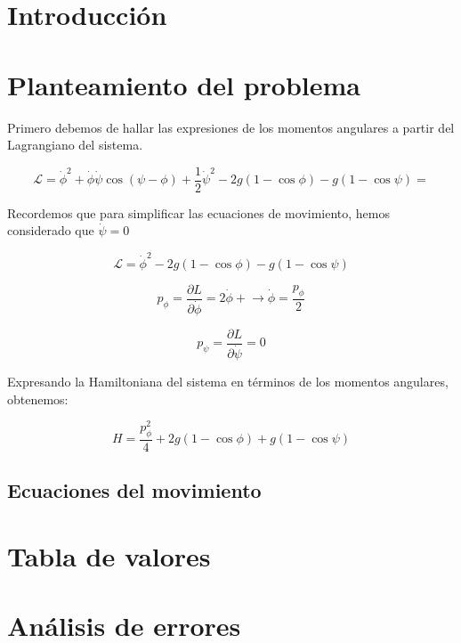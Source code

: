 \documentclass[11pt, twoside]{article} %
\begin{document}
\pagestyle{main}

\section{Introducción}

\section{Planteamiento del problema}
Primero debemos de hallar las expresiones de los momentos angulares
a partir del Lagrangiano del sistema. 

\begin{equation}
    \mathcal{L} = \dot{\phi}^2 + \dot{\phi}\dot{\psi} \cos(\psi - \phi) +
     \frac{1}{2}\dot{\psi}^2 - 2g(1-\cos\phi) - g(1-\cos\psi) = 
\end{equation}

Recordemos que para simplificar las ecuaciones de movimiento, 
hemos considerado que $\dot{\psi} = 0$

\begin{equation}
    \mathcal{L} = \dot{\phi}^2 - 2g(1-\cos\phi) - g(1-\cos\psi)
\end{equation}

\begin{equation}
    p_{\phi} = \frac{\partial L}{\partial \dot{\phi}} = 2\dot{\phi} + 
     \xrightarrow{} \dot{\phi} = \frac{p_{\phi}}{2}
\end{equation}

\begin{equation}
    p_{\psi} = \frac{\partial L}{\partial \dot{\psi}} = 0 
\end{equation}

Expresando la Hamiltoniana del sistema en términos de los momentos 
angulares, obtenemos:

\begin{equation}
    H = \frac{p^2_\phi}{4} + 2g(1 - \cos\phi) + g(1 - \cos\psi)
\end{equation}

\subsection{Ecuaciones del movimiento}


\newpage

\appendix

\section{Tabla de valores}


\newpage

\section{Análisis de errores}
\end{document}
